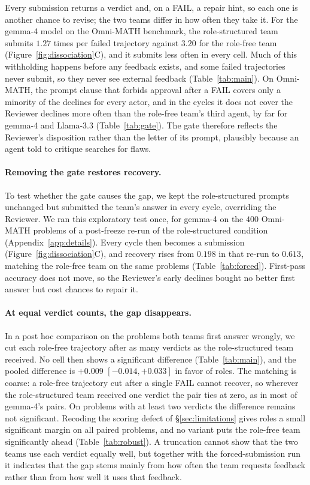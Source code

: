 Every submission returns a verdict and, on a FAIL, a repair hint, so each
one is another chance to revise; the two teams differ in how often they
take it. For the gemma-4 model on the Omni-MATH benchmark, the
role-structured team submits $1.27$ times per failed trajectory against
$3.20$ for the role-free team (Figure~\ref{fig:dissociation}C), and it submits less often in every cell. Much of this
withholding happens before any feedback exists, and some failed trajectories never submit, so they never see external feedback
(Table~\ref{tab:main}). On
Omni-MATH, the prompt clause that forbids approval after a FAIL
covers only a minority of the declines for every actor, and in the cycles
it does not cover the Reviewer declines more often than the role-free
team's third agent, by far for gemma-4 and Llama-3.3 (Table~\ref{tab:gate}). The gate therefore
reflects the Reviewer's disposition rather than the letter of its prompt,
plausibly because an agent told to critique searches for flaws.

\paragraph{Removing the gate restores recovery.} To test whether the gate
causes the gap, we kept the role-structured prompts unchanged but submitted
the team's answer in every cycle, overriding the Reviewer. We ran this
exploratory test once, for gemma-4 on the $400$ Omni-MATH problems of a
post-freeze re-run of the role-structured condition
(Appendix~\ref{app:details}). Every cycle then becomes a submission
(Figure~\ref{fig:dissociation}C), and recovery rises from
$0.198$ in that re-run to $0.613$, matching the role-free team on the same
problems (Table~\ref{tab:forced}). First-pass accuracy does not move, so the Reviewer's early declines bought no better first answer but cost
chances to repair it.

\paragraph{At equal verdict counts, the gap disappears.} In a post hoc
comparison on the problems both teams first answer wrongly, we cut each
role-free trajectory after as many verdicts as the role-structured team
received. No cell then shows a significant difference
(Table~\ref{tab:main}), and the pooled difference is $+0.009$ $[-0.014,+0.033]$ in favor of roles. The matching is coarse: a
role-free trajectory cut after a single FAIL cannot recover, so wherever
the role-structured team received one verdict the pair ties at zero, as in
most of gemma-4's pairs. On problems with at least two verdicts the difference remains not significant.
Recoding the scoring defect of \S\ref{sec:limitations} gives roles a small
significant margin on all paired problems, and no variant puts the role-free team significantly ahead
(Table~\ref{tab:robust}). A truncation cannot show that the two teams use
each verdict equally well, but together with the forced-submission run it
indicates that the gap stems mainly from how often the team requests
feedback rather than from how well it uses that feedback.

